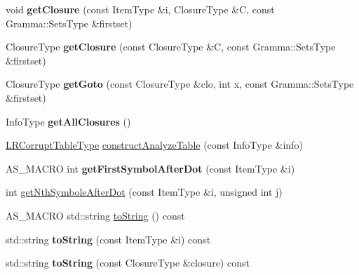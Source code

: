\begin{DoxyCompactItemize}
\item 
\mbox{\label{classx2_1_1_l_r1_gramma_a1ee889288311a6db3305ee6d1fed5f05}} 
void {\bfseries get\+Closure} (const Item\+Type \&i, Closure\+Type \&C, const Gramma\+::\+Sets\+Type \&firstset)
\item 
\mbox{\label{classx2_1_1_l_r1_gramma_a961277ef6df314f2edf297210cebe61a}} 
Closure\+Type {\bfseries get\+Closure} (const Closure\+Type \&C, const Gramma\+::\+Sets\+Type \&firstset)
\item 
\mbox{\label{classx2_1_1_l_r1_gramma_a359e41207d7a512fb5316d0114764400}} 
Closure\+Type {\bfseries get\+Goto} (const Closure\+Type \&clo, int x, const Gramma\+::\+Sets\+Type \&firstset)
\item 
\mbox{\label{classx2_1_1_l_r1_gramma_af9718deaf1e08d45b7fba8f7a8dac40e}} 
Info\+Type {\bfseries get\+All\+Closures} ()
\item 
\hyperlink{classx2_1_1_gramma_a03901eb5b196689b901fbf23e5bb9f0e}{L\+R\+Corrupt\+Table\+Type} \hyperlink{classx2_1_1_l_r1_gramma_ad8e8029481aa8f4ed2990c458ae8e162}{construct\+Analyze\+Table} (const Info\+Type \&info)
\item 
\mbox{\label{classx2_1_1_l_r1_gramma_a8a29870586642ef45f2a564ae8a6e3b1}} 
A\+S\+\_\+\+M\+A\+C\+RO int {\bfseries get\+First\+Symbol\+After\+Dot} (const Item\+Type \&i)
\item 
int \hyperlink{classx2_1_1_l_r1_gramma_abefaef2936a830dd6e4ae26edeaff0d5}{get\+Nth\+Symbole\+After\+Dot} (const Item\+Type \&i, unsigned int j)
\item 
A\+S\+\_\+\+M\+A\+C\+RO std\+::string \hyperlink{classx2_1_1_l_r1_gramma_a80e8b8e656a431117f1b26a39164281f}{to\+String} () const
\item 
\mbox{\label{classx2_1_1_l_r1_gramma_a7fe9aee546e52353260b791500c4c901}} 
std\+::string {\bfseries to\+String} (const Item\+Type \&i) const
\item 
\mbox{\label{classx2_1_1_l_r1_gramma_a7bd9d52d8dca89b8f80d2fbc510781e1}} 
std\+::string {\bfseries to\+String} (const Closure\+Type \&closure) const
\item 

\end{DoxyCompactItemize}
